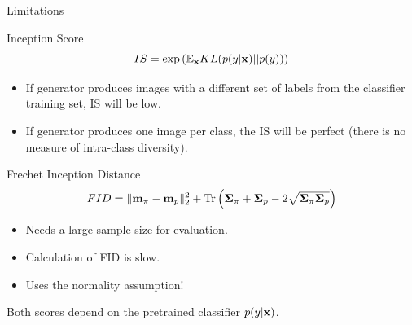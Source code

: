 \documentclass{beamer}
\begin{document}
\begin{frame}{Limitations}
	\vspace{-0.5cm}
	\begin{block}{Inception Score}
		\vspace{-0.5cm}
		\[
			IS =  \exp \left( \mathbb{E}_{\mathbf{x}} KL(p(y | \mathbf{x}) || p(y)) \right)
		\]
		\vspace{-0.7cm}
	\end{block}
	\begin{itemize}
		\item If generator produces images with a different set of labels from the classifier training set, IS will be low.
		\item If generator produces one image per class, the IS will be perfect (there is no measure of intra-class diversity).
	\end{itemize}
	\begin{block}{Frechet Inception Distance}
		\vspace{-0.4cm}
		\[
			FID = \| \mathbf{m}_{\pi} - \mathbf{m}_{p}\|_2^2 + \text{Tr} \left( \boldsymbol{\Sigma}_{\pi} + \boldsymbol{\Sigma}_p - 2 \sqrt{\boldsymbol{\Sigma}_{\pi} \boldsymbol{\Sigma}_p} \right)
		\]
		\vspace{-0.7cm}
	\end{block}
	\begin{itemize}
		\item Needs a large sample size for evaluation.
		\item Calculation of FID is slow.
		\item Uses the normality assumption!
	\end{itemize}
	Both scores depend on the pretrained classifier $p(y | \mathbf{x})$.

\end{frame}
\end{document}
